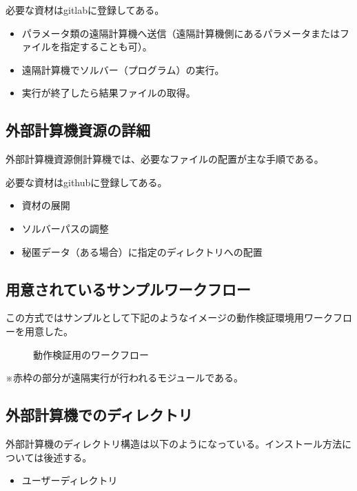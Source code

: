 \documentclass[letterpaper,10pt,dvipdfmx,openany]{sphinxmanual}
\begin{document}
必要な資材はgitlabに登録してある。
\begin{itemize}
\item {} 
パラメータ類の遠隔計算機へ送信（遠隔計算機側にあるパラメータまたはファイルを指定することも可）。

\item {} 
遠隔計算機でソルバー（プログラム）の実行。

\item {} 
実行が終了したら結果ファイルの取得。

\end{itemize}


\subsection{外部計算機資源の詳細}
\label{\detokenize{using_distributed_properties:id8}}
外部計算機資源側計算機では、必要なファイルの配置が主な手順である。

必要な資材はgithubに登録してある。
\begin{itemize}
\item {} 
資材の展開

\item {} 
ソルバーパスの調整

\item {} 
秘匿データ（ある場合）に指定のディレクトリへの配置

\end{itemize}


\subsection{用意されているサンプルワークフロー}
\label{\detokenize{using_distributed_properties:id9}}
この方式ではサンプルとして下記のようなイメージの動作検証環境用ワークフローを用意した。

\begin{figure}[htbp]
\centering
\capstart

\noindent{}
\caption{動作検証用のワークフロー}\label{\detokenize{using_distributed_properties:id44}}\end{figure}

※赤枠の部分が遠隔実行が行われるモジュールである。

\newpage


\subsection{外部計算機でのディレクトリ}
\label{\detokenize{using_distributed_properties:id10}}
外部計算機のディレクトリ構造は以下のようになっている。インストール方法については後述する。
\begin{itemize}
\item {} 
ユーザーディレクトリ

\end{itemize}
\end{document}
